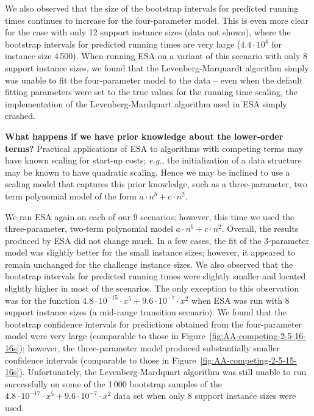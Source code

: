 \documentclass[aic]{iosart2x}
\newcommand{\eg}{\emph{e.g.}}
\begin{document}
We also observed that the size of the bootstrap intervals for predicted running times continues to increase for the four-parameter model. This is even more clear for the case with only 12 support instance sizes (data not shown), where the bootstrap intervals for predicted running times are very large ($4.4\cdot 10^4$ for instance size 4\,500). 
When running ESA on a variant of this scenario with only 8 support instance sizes, we found that the Levenberg-Marquardt algorithm simply was unable to fit the four-parameter model to the data -- even when the default fitting parameters were set to the true values for the running time scaling, the implementation of the Levenberg-Mardquart algorithm used in ESA simply crashed. 

\textbf{What happens if we have prior knowledge about the lower-order terms?}
Practical applications of ESA to algorithms with competing terms may have known scaling for start-up costs; \eg{}, the initialization of a data structure may be known to have quadratic scaling. 
Hence we may be inclined to use a scaling model that captures this prior knowledge, such as a three-parameter, two term polynomial model of the form $a\cdot n^b + c\cdot n^2$. 

We ran ESA again on each of our 9 scenarios; however, this time we used the three-parameter, two-term polynomial model $a\cdot n^b + c\cdot n^2$. 
Overall, the results produced by ESA did not change much. 
In a few cases, the fit of the 3-parameter model was slightly better for the small instance sizes; however, it appeared to remain unchanged for the challenge instance sizes. 
We also observed that the bootstrap intervals for predicted running times were slightly smaller and located slightly higher in most of the scenarios. 
The only exception to this observation was for the function $4.8\cdot 10^{-15} \cdot x^5 + 9.6\cdot 10^{-7} \cdot x^2$ when ESA was run with 8 support instance sizes  (a mid-range transition scenario).
We found that the bootstrap confidence intervals for predictions obtained from the four-parameter model were very large (comparable to those in Figure~\ref{fig:AA-competing-2-5-16-16s}); however, the three-parameter model produced substantially smaller confidence intervals (comparable to those in Figure~\ref{fig:AA-competing-2-5-15-16s}). 
Unfortunately, the Levenberg-Mardquart algorithm was still unable to run successfully on some of the 1\,000 bootstrap samples of the $4.8\cdot 10^{-17} \cdot x^5+ 9.6\cdot 10^{-7} \cdot x^2$ data set when only 8 support instance sizes were used. 
\end{document}
